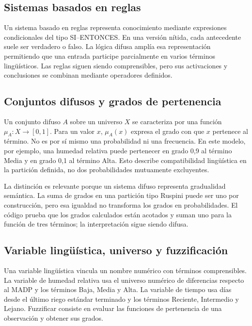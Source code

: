 \documentclass[11pt,letterpaper]{article}
\begin{document}
\subsection{Sistemas basados en reglas}
Un sistema basado en reglas representa conocimiento mediante expresiones condicionales del tipo SI--ENTONCES. En una versión nítida, cada antecedente suele ser verdadero o falso. La lógica difusa amplía esa representación permitiendo que una entrada participe parcialmente en varios términos lingüísticos. Las reglas siguen siendo comprensibles, pero sus activaciones y conclusiones se combinan mediante operadores definidos.

\subsection{Conjuntos difusos y grados de pertenencia}
Un conjunto difuso $A$ sobre un universo $X$ se caracteriza por una función $\mu_A:X\to[0,1]$. Para un valor $x$, $\mu_A(x)$ expresa el grado con que $x$ pertenece al término. No es por sí mismo una probabilidad ni una frecuencia. En este modelo, por ejemplo, una humedad relativa puede pertenecer en grado 0,9 al término Media y en grado 0,1 al término Alta. Esto describe compatibilidad lingüística en la partición definida, no dos probabilidades mutuamente excluyentes.

La distinción es relevante porque un sistema difuso representa gradualidad semántica. La suma de grados en una partición tipo Ruspini puede ser uno por construcción, pero esa igualdad no transforma los grados en probabilidades. El código prueba que los grados calculados están acotados y suman uno para la función de tres términos; la interpretación sigue siendo difusa.

\subsection{Variable lingüística, universo y fuzzificación}
Una variable lingüística vincula un nombre numérico con términos comprensibles. La variable de humedad relativa usa el universo numérico de diferencias respecto al MADP y los términos Baja, Media y Alta. La variable de tiempo usa días desde el último riego estándar terminado y los términos Reciente, Intermedio y Lejano. Fuzzificar consiste en evaluar las funciones de pertenencia de una observación y obtener sus grados.
\end{document}
